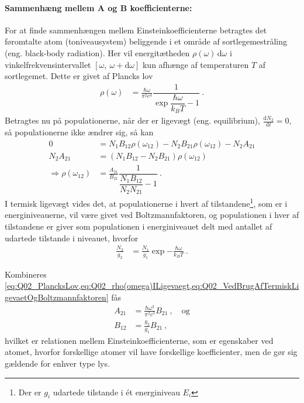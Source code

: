 \paragraph{Sammenhæng mellem A og B koefficienterne:} For at finde sammenhængen mellem Einsteinkoefficienterne betragtes det føromtalte atom (toniveausystem) beliggende i et område af sortlegemestråling (eng. black-body radiation). Her vil energitætheden $\rho(\omega)\,\text{d}\omega$ i vinkelfrekvensintervallet $[\omega,\: \omega + \text{d}\omega]$ kun afhænge af temperaturen $T$ af sortlegemet. Dette er givet af Plancks lov
\begin{align} \label{eq:Q02_PlancksLov}
    \rho(\omega) &= \frac{\hbar\omega}{\pi^2c^3} \dfrac{1}{\exp{\dfrac{\hbar\omega}{k_B T}} - 1} \: .
\end{align}
Betragtes nu på populationerne, når der er ligevægt (eng. equilibrium), $\frac{\text{d}N_2}{\text{d}t} = 0$, så populationerne ikke ændrer sig, så kan 
\begin{align} \label{eq:Q02_rho(omega)ILigevaegt}
    0 &= N_1 B_{12} \rho(\omega_{12}) - N_2 B_{21} \rho(\omega_{12}) - N_2 A_{21} \nonumber\\
    N_2 A_{21} &= \left(N_1 B_{12} - N_2 B_{21}\right) \rho(\omega_{12}) \nonumber\\
    \Rightarrow \rho(\omega_{12}) &= \frac{A_{21}}{B_{21}} \dfrac{1}{\dfrac{N_1 B_{12}}{N_2 N_{21}} - 1} \: .
\end{align}
I termisk ligevægt vides det, at populationerne i hvert af tilstandene\footnote{Der er $g_i$ udartede tilstande i ét energiniveau $E_i$}, som er i energiniveauerne, vil være givet ved Boltzmannfaktoren, og populationen i hver af tilstandene er giver som populationen i energiniveauet delt med antallet af udartede tilstande i niveauet, hvorfor
\begin{align} \label{eq:Q02_VedBrugAfTermiskLigevaetOgBoltzmannfaktoren}
    \frac{N_2}{g_2} &= \frac{N_1}{g_1}\exp{-\frac{\hbar\omega}{k_B T}} \: .
\end{align}

Kombineres \cref{eq:Q02_PlancksLov,eq:Q02_rho(omega)ILigevaegt,eq:Q02_VedBrugAfTermiskLigevaetOgBoltzmannfaktoren} fås
\begin{align}
    A_{21} & =\frac{\hbar\omega^3}{\pi^2c^3} B_{21} \: , \quad \text{og} \label{eq:Q02_A21} \\
    B_{12} &= \frac{g_2}{g_1} B_{21} \: , \label{eq:Q02_B12SomFunktionAfB21}
\end{align}
hvilket er relationen mellem Einsteinkoefficienterne, som er egenskaber ved atomet, hvorfor forskellige atomer vil have forskellige koefficienter, men de gør sig gældende for enhver type lys.


